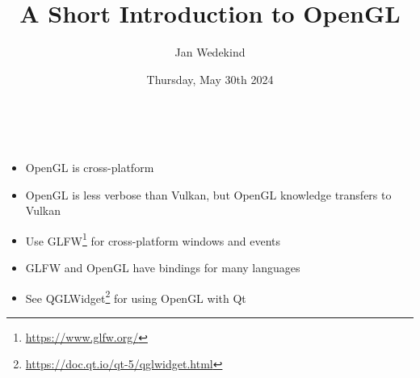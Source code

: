 \documentclass[calcdimensions,landscape,letterpaper]{powersem}
\title{A Short Introduction to OpenGL}
\author{Jan Wedekind}
\date{Thursday, May 30th 2024}
\newcommand{\thecurrentheading}{}
\newcommand{\heading}[1]{\renewcommand{\thecurrentheading}{#1}}
\begin{document}
\begin{slide}
  \heading{\ }
  \begin{center}
    \maketitle
  \end{center}
\end{slide}

\begin{slide}
  \heading{Motivation}
  \begin{center}
    \bigskip\\
    \begin{minipage}[c]{.95\textwidth}
      \begin{itemize}
          \item OpenGL is cross-platform
          \item OpenGL is less verbose than Vulkan, but OpenGL knowledge transfers to Vulkan
          \item Use GLFW\footnote{\url{https://www.glfw.org/}} for cross-platform windows and events
          \item GLFW and OpenGL have bindings for many languages
          \item See QGLWidget\footnote{\url{https://doc.qt.io/qt-5/qglwidget.html}} for using OpenGL with Qt
      \end{itemize}
    \end{minipage}
  \end{center}
\end{slide}
\end{document}
